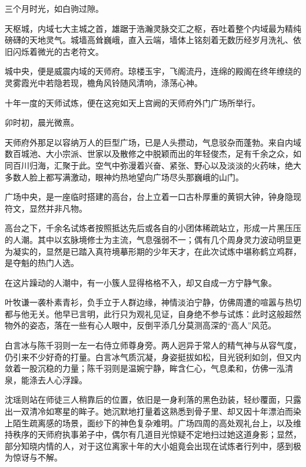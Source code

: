 \vspace{2em}

三个月时光，如白驹过隙。

\vspace{2em}

天枢城，内域七大主城之首，雄踞于浩瀚灵脉交汇之枢，吞吐着整个内域最为精纯磅礴的天地灵气。城墙高耸巍峨，直入云端，墙体上铭刻着无数历经岁月洗礼、依旧闪烁着微光的古老符文。

城中央，便是威震内域的天师府。琼楼玉宇，飞阁流丹，连绵的殿阁在终年缭绕的灵雾霞光中若隐若现，檐角风铃随风清响，涤荡心神。

十年一度的天师试炼，便在这宛如天上宫阙的天师府外门广场所举行。

\vspace{2em}

卯时初，晨光微熹。

天师府外那足以容纳万人的巨型广场，已是人头攒动，气息驳杂而蓬勃。来自内域数百城池、大小宗派、世家以及散修之中脱颖而出的年轻俊杰，足有千余之众，如同百川归海，汇聚于此。空气中弥漫着兴奋、紧张、野心以及淡淡的火药味，绝大多数人脸上都写满激动，眼神灼热地望向广场尽头那巍峨的山门。

广场中央，是一座临时搭建的高台，台上立着一口古朴厚重的黄铜大钟，钟身隐现符文，显然并非凡物。

高台之下，千余名试炼者按照抵达先后或各自的小团体稀疏站立，形成一片黑压压的人潮。其中以玄脉境修士为主流，气息强弱不一；偶有几个周身灵力波动明显更为凝实的，显然是已踏入真符境摹形期的少年天才，在此次试炼中堪称鹤立鸡群，是夺魁的热门人选。

在这片躁动的人潮中，有一小簇人显得格格不入，却又自成一方宁静气象。

叶牧谦一袭朴素青衫，负手立于人群边缘，神情淡泊宁静，仿佛周遭的喧嚣与热切都与他无关。他早已言明，此行只为观礼见证，自身绝不参与试炼：此时这般超然物外的姿态，落在一些有心人眼中，反倒平添几分莫测高深的“高人”风范。

白言冰与陈千羽则一左一右侍立师尊身旁。两人迥异于常人的精气神与从容气度，仍引来不少好奇的打量。白言冰气质沉凝，身姿挺拔如松，目光锐利如剑，但又内敛着一股沉稳的力量；陈千羽则是温婉宁静，眸含仁心，气息柔和，仿佛一泓清泉，能涤去人心浮躁。

沈瑶则站在师徒三人稍靠后的位置，依旧是一身利落的黑色劲装，轻纱覆面，只露出一双清冷如寒星的眸子。她沉默地打量着这熟悉到骨子里、却又因十年漂泊而染上陌生疏离感的场景，面纱下的神色复杂难明。广场四周的高处观礼台上，以及维持秩序的天师府执事弟子中，偶尔有几道目光惊疑不定地扫过她这道身影；显然，部分知晓内情的人，对于这位离家十年的大小姐竟会出现在试炼者行列中，感到极为惊讶与不解。

